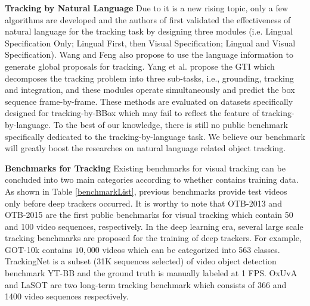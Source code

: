 \documentclass[final]{cvpr}
\begin{document}
\textbf{Tracking by Natural Language } 
Due to it is a new rising topic, only a few algorithms are developed and the authors of \cite{li2017tracking} first validated the effectiveness of natural language for the tracking task by designing three modules (i.e. Lingual Specification Only; Lingual First, then Visual Specification; Lingual and Visual Specification). Wang \cite{wang2018describe} and Feng \cite{feng2019robust} also propose to use the language information to generate global proposals for tracking. Yang et al. propose the GTI \cite{yang2019grounding} which decomposes the tracking problem into three sub-tasks, i.e., grounding, tracking and integration, and these modules operate simultaneously and predict the box sequence frame-by-frame. These methods are evaluated on datasets specifically designed for tracking-by-BBox which may fail to reflect the feature of tracking-by-language. To the best of our knowledge, there is still no public benchmark specifically dedicated to the tracking-by-language task. We believe our benchmark will greatly boost the researches on natural language related object tracking. 



\textbf{Benchmarks for Tracking }
Existing benchmarks for visual tracking can be concluded into two main categories according to whether contains training data. As shown in Table \ref{benchmarkList}, previous benchmarks \cite{Liang2015Encoding, Wu2013Online, wu2015object, VOT_TPAMI, nus_pro, li2017visualuav, li2017visualuav, kiani2017Nfs} provide test videos only before deep trackers occurred. It is worthy to note that OTB-2013 \cite{Wu2013Online} and OTB-2015 \cite{wu2015object} are the first public benchmarks for visual tracking which contain 50 and 100 video sequences, respectively. In the deep learning era, several large scale tracking benchmarks are proposed for the training of deep trackers. For example, GOT-10k \cite{huang2019got10k} contains $10,000$ videos which can be categorized into 563 classes. TrackingNet \cite{muller2018trackingnet} is a subset (31K sequences selected) of video object detection benchmark YT-BB \cite{real2017YTBB} and the ground truth is manually labeled at 1 FPS. OxUvA \cite{valmadre2018longOxUVA} and LaSOT \cite{fan2019lasot} are two long-term tracking benchmark which consists of 366 and 1400 video sequences respectively. 
\end{document}
